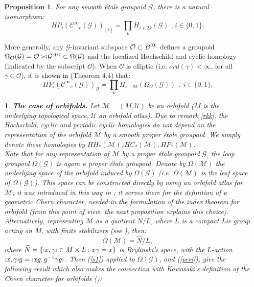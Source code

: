 \documentclass[a4paper]{article}
\newtheorem{prop}[st]{Proposition}
\newtheorem{num}[st]{}
\newcommand{\OO}{\ensuremath{\mathcal{O}}}
\newcommand{\G}{\ensuremath{\mathcal{G}}}
\newcommand{\C}{\ensuremath{\mathcal{C}}}
\newcommand{\cii}{\ensuremath{\C^{\infty}}}
\newcommand{\ps}{{\raise 1pt\hbox{\tiny (}}}
\newcommand{\pd}{{\raise 1pt\hbox{\tiny )}}}
\newcommand{\nG}[1]{\ensuremath{\G^{\,\ps #1\,\pd}}}
\def\cross{\mathinner{\mathrel{\raise0.8pt\hbox{$\scriptstyle>$}}
                 \joinrel\mathrel\triangleleft}}
\newcommand{\nB}[1]{\ensuremath{B^{\ps #1\pd}}}
\begin{document}
\begin{prop} 
\label{perrii} 
For any smooth \'etale groupoid $\G$, there is a natural isomorphism:
\[ HP_{i}(\cii_c(\G))_{[1]} = \prod_{k} H_{i+ 2k} (\G) \ \ , i \in \{0, 1\}.\]
 \end{prop} 

More generally, any $\G$-invariant subspace $\OO \subset \nB{0}$ defines a groupoid $\Omega_{\OO}(\G)= \OO\cross\nG{0} \subset \Omega(\G)$ and the localized Hochschild and cyclic homology (indicated by the subscript $\OO$). When $\OO$ is elliptic (i.e. $ord(\gamma) < \infty$, for all $\gamma \in \OO$), it is shown in \cite{Cra} (Theorem 4.4) that:
\begin{equation}
\label{peri}
HP_i(\cii_c(\G))_{\OO} = \prod_k H_{i+ 2k}(\Omega_{\OO}(\G))\ \ , \  i\in \{ 0, 1\} .
\end{equation}

\begin{num}
\emph{
{\bf The case of orbifolds.} Let $\mathcal{M}= (M, \mathcal{U})$ be an orbifold ($M$ is the underlying topological space, $\mathcal{U}$ an orbifold atlas). Due to remark \ref{rkk}, the Hochschild, cyclic and periodic cyclic homologies do not depend on the representation of the orbifold $\mathcal{M}$ by a smooth proper \'etale groupoid. We simply denote these homologies by $HH_*(\mathcal{M}), HC_*(\mathcal{M}), HP_*(\mathcal{M})$.\\
\hspace*{.3in} Note that for any representation of $\mathcal{M}$ by a proper \'etale groupoid $\G$, the loop groupoid $\Omega(\G)$ is again a proper \'etale groupoid. Denote by $\Omega(\mathcal{M})$ the underlying space of the orbifold induced by $\Omega(\G)$ (i.e. $\Omega(\mathcal{M})$ is the leaf space of $\Omega(\G)$). This space can be constructed directly by using an orbifold atlas for $\mathcal{M}$; it was introduced in this way in \cite{Kaw}; it serves there for the definition of a geometric Chern character, needed in the formulation of the index theorem for orbifold (from this point of view, the next proposition explains this choice). Alternatively, representing $\mathcal{M}$ as a quotient $N/L$, where $L$ is a compact Lie group acting on $M$, with finite stabilizers (see \cite{MP}), then:
\[ \Omega(\mathcal{M}) = \widehat{N}/L,\]
where $\widehat{N}=\{ \ps x, \gamma\pd\in M\times L : x\gamma = x\}$ is Brylinski's space, with the $L$-action $\ps x, \gamma\pd g = \ps xg, g^{-1}\gamma g\pd$. Then  (\ref{s1}) applied to $\Omega(\G)$, and (\ref{peri}), give the following result which also makes the connection with Kawasaki's definition of the Chern character for orbifolds (\cite{Kaw}):
}
\end{num}
\end{document}
